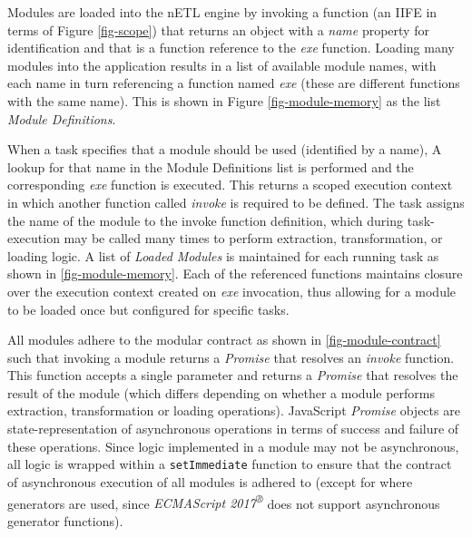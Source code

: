 

Modules are loaded into the nETL engine by invoking a function (an IIFE in terms of Figure \ref{fig-scope}) that returns an object with a \textit{name} property for identification and that is a function reference to the \textit{exe} function. Loading many modules into the application results in a list of available module names, with each name in turn referencing a function named \textit{exe} (these are different functions with the same name). This is shown in Figure \ref{fig-module-memory} as the list \textit{Module Definitions}.

When a task specifies that a module should be used (identified by a name), A lookup for that name in the Module Definitions list is performed and the corresponding \textit{exe} function is executed. This returns a scoped execution context in which another function called \textit{invoke} is required to be defined. The task assigns the name of the module to the invoke function definition, which during task-execution may be called many times to perform extraction, transformation, or loading logic. A list of \textit{Loaded Modules} is maintained for each running task as shown in \ref{fig-module-memory}. Each of the referenced functions maintains closure over the execution context\cite{executionContext} created on \textit{exe} invocation, thus allowing for a module to be loaded once but configured for specific tasks.



All modules adhere to the modular contract as shown in \ref{fig-module-contract} such that invoking a module returns a \textit{Promise} \cite{jsPromises} that resolves an \textit{invoke} function. This function accepts a single parameter and returns a \textit{Promise} that resolves the result of the module (which differs depending on whether a module performs extraction, transformation or loading operations). JavaScript \textit{Promise} objects are state-representation of asynchronous operations in terms of success and failure of these operations. Since logic implemented in a module may not be asynchronous, all logic is wrapped within a \texttt{setImmediate} function to ensure that the contract of asynchronous execution of all modules is adhered to (except for where generators are used, since \textit{ECMAScript 2017\textsuperscript{®}} does not support asynchronous generator functions).



